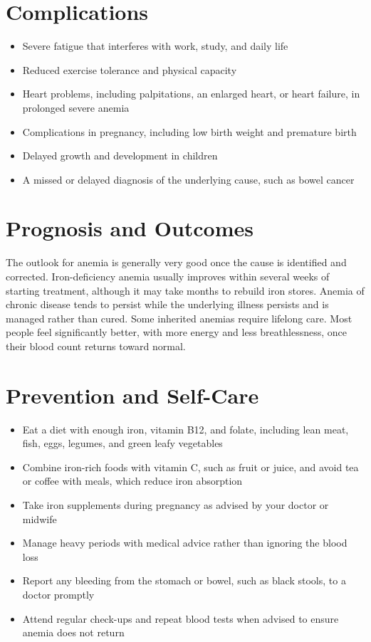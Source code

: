 \section*{Complications}
\begin{itemize}
    \item Severe fatigue that interferes with work, study, and daily life
    \item Reduced exercise tolerance and physical capacity
    \item Heart problems, including palpitations, an enlarged heart, or heart failure, in prolonged severe anemia
    \item Complications in pregnancy, including low birth weight and premature birth
    \item Delayed growth and development in children
    \item A missed or delayed diagnosis of the underlying cause, such as bowel cancer
\end{itemize}

\section*{Prognosis and Outcomes}
The outlook for anemia is generally very good once the cause is identified and corrected. Iron-deficiency anemia usually improves within several weeks of starting treatment, although it may take months to rebuild iron stores. Anemia of chronic disease tends to persist while the underlying illness persists and is managed rather than cured. Some inherited anemias require lifelong care. Most people feel significantly better, with more energy and less breathlessness, once their blood count returns toward normal.

\section*{Prevention and Self-Care}
\begin{itemize}
    \item Eat a diet with enough iron, vitamin B12, and folate, including lean meat, fish, eggs, legumes, and green leafy vegetables
    \item Combine iron-rich foods with vitamin C, such as fruit or juice, and avoid tea or coffee with meals, which reduce iron absorption
    \item Take iron supplements during pregnancy as advised by your doctor or midwife
    \item Manage heavy periods with medical advice rather than ignoring the blood loss
    \item Report any bleeding from the stomach or bowel, such as black stools, to a doctor promptly
    \item Attend regular check-ups and repeat blood tests when advised to ensure anemia does not return
\end{itemize}

